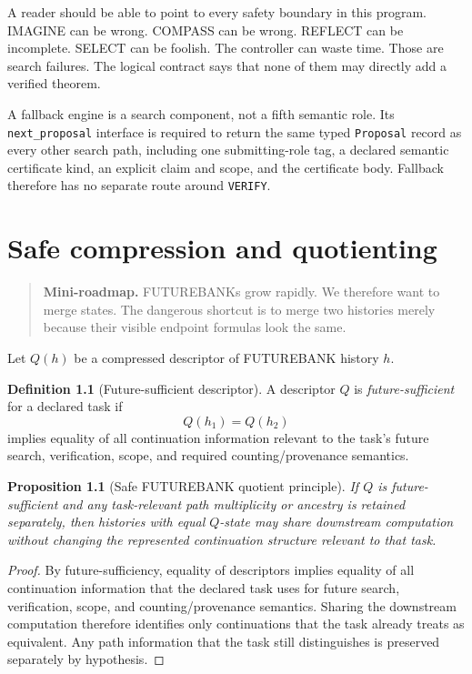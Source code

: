 \documentclass[11pt,openany]{book}
\newtheorem{proposition}[theorem]{Proposition}
\theoremstyle{definition}
\newtheorem{definition}[theorem]{Definition}
\theoremstyle{remark}
\newenvironment{miniroadmap}{\begin{quote}\small\color{deepblue}\textbf{Mini-roadmap.} }{\end{quote}}
\begin{document}
A reader should be able to point to every safety boundary in this program. IMAGINE can be wrong. COMPASS can be wrong. REFLECT can be incomplete. SELECT can be foolish. The controller can waste time. Those are search failures. The logical contract says that none of them may directly add a verified theorem.

A fallback engine is a search component, not a fifth semantic role. Its \texttt{next\_proposal} interface is required to return the same typed \texttt{Proposal} record as every other search path, including one submitting-role tag, a declared semantic certificate kind, an explicit claim and scope, and the certificate body. Fallback therefore has no separate route around \texttt{VERIFY}.

\chapter{Safe compression and quotienting}\label{ch:safequotient}
\begin{miniroadmap}
FUTUREBANKs grow rapidly. We therefore want to merge states. The dangerous shortcut is to merge two histories merely because their visible endpoint formulas look the same.
\end{miniroadmap}

Let $Q(h)$ be a compressed descriptor of FUTUREBANK history $h$.

\begin{definition}[Future-sufficient descriptor]
A descriptor $Q$ is \emph{future-sufficient} for a declared task if
\[
Q(h_1)=Q(h_2)
\]
implies equality of all continuation information relevant to the task's future search, verification, scope, and required counting/provenance semantics.
\end{definition}

\begin{proposition}[Safe FUTUREBANK quotient principle]\label{prop:safequotient}
If $Q$ is future-sufficient and any task-relevant path multiplicity or ancestry is retained separately, then histories with equal $Q$-state may share downstream computation without changing the represented continuation structure relevant to that task.
\end{proposition}
\begin{proof}
By future-sufficiency, equality of descriptors implies equality of all continuation information that the declared task uses for future search, verification, scope, and counting/provenance semantics. Sharing the downstream computation therefore identifies only continuations that the task already treats as equivalent. Any path information that the task still distinguishes is preserved separately by hypothesis.
\end{proof}
\end{document}
